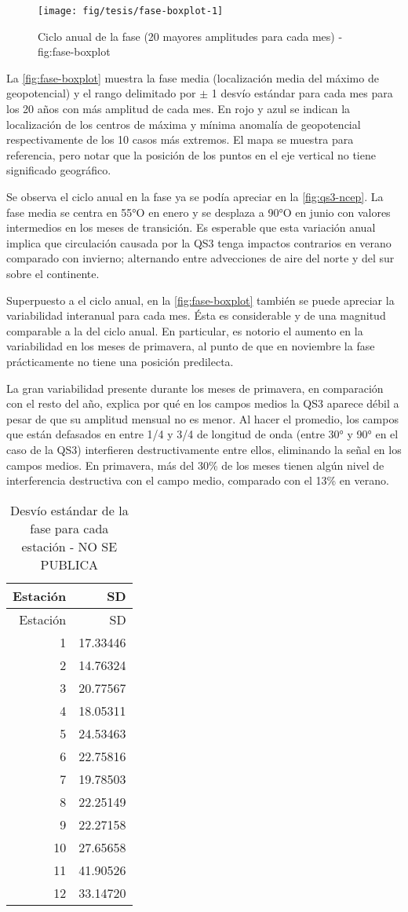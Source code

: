 \documentclass[spanish,a4paper]{book}
\begin{document}
\begin{figure}

{\centering \texttt{[image: fig/tesis/fase-boxplot-1]} 

}

\caption{Ciclo anual de la fase (20 mayores amplitudes para cada mes) - fig:fase-boxplot}\label{fig:fase-boxplot}
\end{figure}

La \autoref{fig:fase-boxplot} muestra la fase media (localización media
del máximo de geopotencial) y el rango delimitado por \(\pm\) 1 desvío
estándar para cada mes para los 20 años con más amplitud de cada mes. En
rojo y azul se indican la localización de los centros de máxima y mínima
anomalía de geopotencial respectivamente de los 10 casos más extremos.
El mapa se muestra para referencia, pero notar que la posición de los
puntos en el eje vertical no tiene significado geográfico.

Se observa el ciclo anual en la fase ya se podía apreciar en la
\autoref{fig:qs3-ncep}. La fase media se centra en 55°O en enero y se
desplaza a 90°O en junio con valores intermedios en los meses de
transición. Es esperable que esta variación anual implica que
circulación causada por la QS3 tenga impactos contrarios en verano
comparado con invierno; alternando entre advecciones de aire del norte y
del sur sobre el continente.

Superpuesto a el ciclo anual, en la \autoref{fig:fase-boxplot} también
se puede apreciar la variabilidad interanual para cada mes. Ésta es
considerable y de una magnitud comparable a la del ciclo anual. En
particular, es notorio el aumento en la variabilidad en los meses de
primavera, al punto de que en noviembre la fase prácticamente no tiene
una posición predilecta.

La gran variabilidad presente durante los meses de primavera, en
comparación con el resto del año, explica por qué en los campos medios
la QS3 aparece débil a pesar de que su amplitud mensual no es menor. Al
hacer el promedio, los campos que están defasados en entre 1/4 y 3/4 de
longitud de onda (entre 30° y 90° en el caso de la QS3) interfieren
destructivamente entre ellos, eliminando la señal en los campos medios.
En primavera, más del 30\% de los meses tienen algún nivel de
interferencia destructiva con el campo medio, comparado con el 13\% en
verano.

\begin{longtable}[]{@{}rr@{}}
\caption{Desvío estándar de la fase para cada estación - NO SE
PUBLICA}\tabularnewline
\toprule
Estación & SD\tabularnewline
\midrule
\endfirsthead
\toprule
Estación & SD\tabularnewline
\midrule
\endhead
1 & 17.33446\tabularnewline
2 & 14.76324\tabularnewline
3 & 20.77567\tabularnewline
4 & 18.05311\tabularnewline
5 & 24.53463\tabularnewline
6 & 22.75816\tabularnewline
7 & 19.78503\tabularnewline
8 & 22.25149\tabularnewline
9 & 22.27158\tabularnewline
10 & 27.65658\tabularnewline
11 & 41.90526\tabularnewline
12 & 33.14720\tabularnewline
\bottomrule
\end{longtable}
\end{document}
